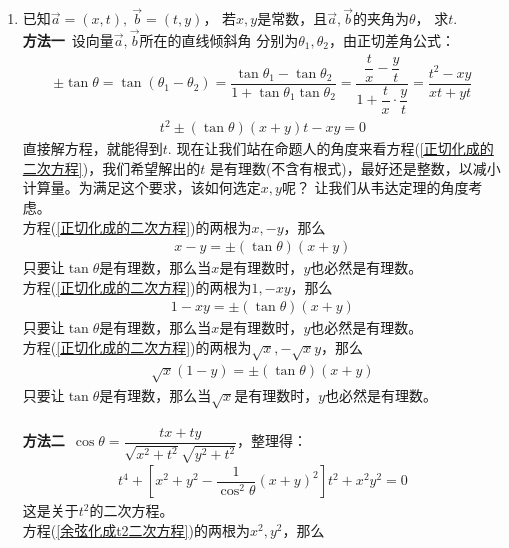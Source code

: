 \begin{enumerate}[label={【\textbf{例\thechapter.\arabic*}】},
 leftmargin=\inteval{\myenumleftmargin}pt,
 itemsep=\inteval{\myenumitempsep}pt,
 itemindent=\inteval{\myenumitemindent}pt]
\item 已知$ \vec{a}=(x,t),\ \vec{b}=(t,y) $，
若$ x,y $是常数，且$ \vec{a},\vec{b} $的夹角为$ \theta $，
求$ t $. \\
\textbf{方法一}\ 设向量$ \vec{a},\vec{b} $所在的直线倾斜角
分别为$ \theta_1,\theta_2 $，由正切差角公式：
\begin{gather*}
    \pm\tan\theta=\tan(\theta_1-\theta_2)=\dfrac{\tan\theta_1-\tan\theta_2}
    {1+\tan\theta_1	\tan\theta_2}=\dfrac{\dfrac{t}{x}-\dfrac{y}{t}}{1+
        \dfrac{t}{x}\cdot\dfrac{y}{t}}=\dfrac{t^2-xy}{xt+yt} 
\end{gather*}
\begin{gather}\label{正切化成的二次方程}
    t^2\pm(\tan\theta)(x+y)t-xy=0
\end{gather}
直接解方程，就能得到$ t $. 
现在让我们站在命题人的角度来看方程(\ref{正切化成的二次方程})，我们希望解出的$ t $
是有理数(不含有根式)，最好还是整数，以减小计算量。为满足这个要求，该如何选定$ x,y $呢？
让我们从韦达定理的角度考虑。\\
 方程(\ref{正切化成的二次方程})的两根为$ x,-y $，那么
\begin{gather}\label{考虑有理数-情形1}
    x-y=\pm(\tan\theta)(x+y)
\end{gather}
只要让$ \tan\theta $是有理数，那么当$ x $是有理数时，$ y $也必然是有理数。\\
 方程(\ref{正切化成的二次方程})的两根为$ 1,-xy $，那么
\begin{gather}\label{考虑有理数-情形2}
    1-xy=\pm(\tan\theta)(x+y)
\end{gather}
只要让$ \tan\theta $是有理数，那么当$ x $是有理数时，$ y $也必然是有理数。\\
 方程(\ref{正切化成的二次方程})的两根为$ \sqrt{x},-\sqrt{x}y $，那么
\begin{gather}\label{考虑有理数-情形3}
    \sqrt{x}(1-y)=\pm(\tan\theta)(x+y) 
\end{gather}
只要让$ \tan\theta $是有理数，那么当$ \sqrt{x} $是有理数时，$ y $也必然是有理数。\\
\\
\textbf{方法二}\ $ \cos\theta=\dfrac{tx+ty}{\sqrt{x^2+t^2}\sqrt{y^2+t^2}} $，整理得：
\begin{align}\label{余弦化成t2二次方程}
    t^4+\left[x^2+y^2-\dfrac{1}{\cos^2\theta}(x+y)^2\right]t^2+x^2y^2=0
\end{align}
这是关于$ t^2 $的二次方程。\\
 方程(\ref{余弦化成t2二次方程})的两根为$ x^2,y^2 $，那么

\end{enumerate}
